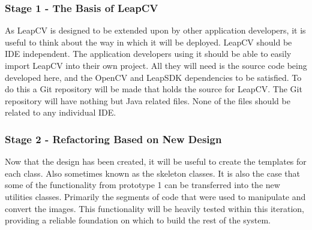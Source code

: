 \documentclass[11pt,oneside]{report}
\begin{document}
		\subsubsection{Stage 1 - The Basis of LeapCV}
			As LeapCV is designed to be extended upon by other application developers, it is useful to think about the way in which it will be deployed.
			LeapCV should be IDE independent.
			The application developers using it should be able to easily import LeapCV into their own project.
			All they will need is the source code being developed here, and the OpenCV and LeapSDK dependencies to be satisfied.
			To do this a Git repository will be made that holds the source for LeapCV.
			The Git repository will have nothing but Java related files.
			None of the files should be related to any individual IDE.

		\subsubsection{Stage 2 - Refactoring Based on New Design}
			Now that the design has been created, it will be useful to create the templates for each class.
			Also sometimes known as the skeleton classes.
			It is also the case that some of the functionality from prototype 1 can be transferred into the new utilities classes.
			Primarily the segments of code that were used to manipulate and convert the images.
			This functionality will be heavily tested within this iteration, providing a reliable foundation on which to build the rest of the system.
			
\end{document}
